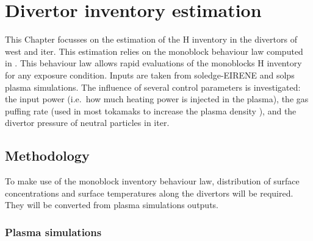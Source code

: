 \setchapterpreamble[u]{\margintoc}
\chapter{Divertor inventory estimation}\label{Chapter4}


This Chapter focusses on the estimation of the \gls{H} \gls{inventory} in the \glspl{divertor} of \gls{west} and \gls{iter}.
This estimation relies on the \gls{monoblock} behaviour law computed in .
This behaviour law allows rapid evaluations of the \glspl{monoblock} \gls{H} \gls{inventory} for any exposure condition.
Inputs are taken from \gls{soledge}-EIRENE \cite{bufferand_three-dimensional_2019} and \gls{solps} \cite{kaveeva_solps-iter_2020} plasma simulations.
The influence of several control parameters is investigated: the input power (i.e.\ how much heating power is injected in the plasma), the gas puffing rate (used in most \glspl{tokamak} to increase the \gls{plasma} density \cite{zweben_effect_2014}), and the \gls{divertor} pressure of neutral particles in \gls{iter}.


\section{Methodology}
To make use of the \gls{monoblock} \gls{inventory} behaviour law, distribution of surface concentrations and surface temperatures along the \glspl{divertor} will be required.
They will be converted from plasma simulations outputs.

\subsection{Plasma simulations}

